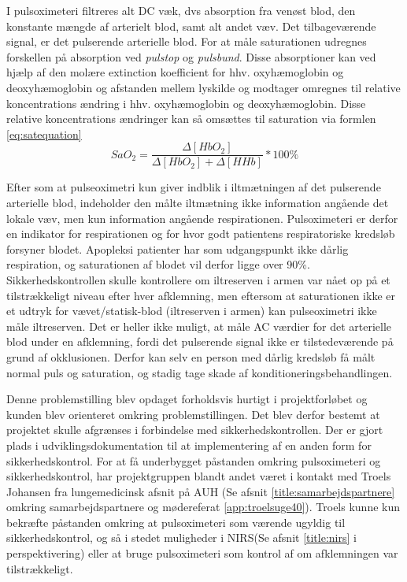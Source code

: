I pulsoximeteri filtreres alt DC væk, dvs absorption fra venøst blod, den konstante mængde af arterielt blod, samt alt andet væv. Det tilbageværende signal, er det pulserende arterielle blod. For at måle saturationen udregnes forskellen på absorption ved \textit{pulstop} og \textit{pulsbund}. Disse absorptioner kan ved hjælp af den molære extinction koefficient for hhv. oxyhæmoglobin og deoxyhæmoglobin og afstanden mellem lyskilde og modtager omregnes til relative koncentrations ændring i hhv. oxyhæmoglobin og deoxyhæmoglobin. Disse relative koncentrations ændringer kan så omsættes til saturation via formlen \ref{eq:satequation}
\begin{equation}
	SaO_2 = \frac{\Delta[HbO_2]}{\Delta[HbO_2]+\Delta[HHb]} *100\%
	\label{eq:satequation}
\end{equation}

Efter som at pulseoximetri kun giver indblik i iltmætningen af det pulserende arterielle blod, indeholder den målte iltmætning ikke information angående det lokale væv, men kun information angående respirationen. Pulsoximeteri er derfor en indikator for respirationen og for hvor godt patientens respiratoriske kredsløb forsyner blodet. Apopleksi patienter har som udgangspunkt ikke dårlig respiration, og saturationen af blodet vil derfor ligge over 90\%. Sikkerhedskontrollen skulle kontrollere om iltreserven i armen var nået op på et tilstrækkeligt niveau efter hver afklemning, men eftersom at saturationen ikke er et udtryk for vævet/statisk-blod (iltreserven i armen) kan pulseoximetri ikke måle iltreserven.
Det er heller ikke muligt, at måle AC værdier for det arterielle blod under en afklemning, fordi det pulserende signal ikke er tilstedeværende på grund af okklusionen. Derfor kan selv en person med dårlig kredsløb få målt normal puls og saturation, og stadig tage skade af konditioneringsbehandlingen. 

Denne problemstilling blev opdaget forholdsvis hurtigt i projektforløbet og kunden blev orienteret omkring problemstillingen. Det blev derfor bestemt at projektet skulle afgrænses i forbindelse med sikkerhedskontrollen. Der er gjort plads i udviklingsdokumentation til at implementering af en anden form for sikkerhedskontrol. For at få underbygget påstanden omkring pulsoximeteri og sikkerhedskontrol, har projektgruppen blandt andet været i kontakt med Troels Johansen fra lungemedicinsk afsnit på AUH (Se afsnit \ref{title:samarbejdspartnere} omkring samarbejdspartnere og mødereferat \ref{app:troelsuge40}). Troels kunne kun bekræfte påstanden omkring at pulsoximeteri som værende ugyldig til sikkerhedskontrol, og så i stedet muligheder i NIRS(Se afsnit \ref{title:nirs} i perspektivering) eller at bruge pulsoximeteri som kontrol af om afklemningen var tilstrækkeligt. 

